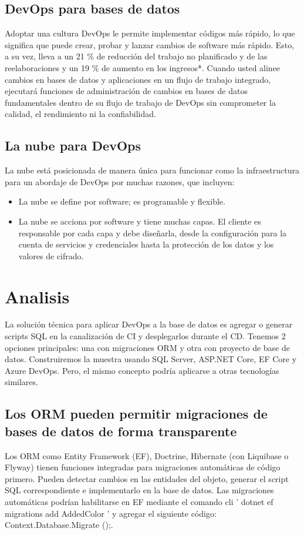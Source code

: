 \documentclass[preprint,12pt]{elsarticle}
\begin{document}
\subsection{DevOps para bases de datos}	


Adoptar una cultura DevOps le permite implementar códigos más rápido, lo que significa que puede crear, probar y lanzar cambios de software más rápido. Esto, a su vez, lleva a un 21 \% de reducción del trabajo no planificado y de las reelaboraciones y un 19 \% de aumento en los ingresos*. Cuando usted alinee cambios en bases de datos y aplicaciones en un flujo de trabajo integrado, ejecutará funciones de administración de cambios en bases de datos fundamentales dentro de su flujo de trabajo de DevOps sin comprometer la calidad, el rendimiento ni la confiabilidad.\citep{referencia10}


\subsection{La nube para DevOps}

La nube está posicionada de manera única para funcionar como la infraestructura para un abordaje de DevOps por muchas razones, que incluyen:
\begin{itemize}

\item La nube se define por software; es programable y flexible.
\item La nube se acciona por software y tiene muchas capas. El cliente es responsable por cada capa y debe diseñarla, desde la configuración para la cuenta de servicios y credenciales hasta la protección de los datos y los valores de cifrado.\citep{referencia09}
\end{itemize} 


\section{Analisis}

La solución técnica para aplicar DevOps a la base de datos es agregar o generar scripts SQL en la canalización de CI y desplegarlos durante el CD.
Tenemos 2 opciones principales: una con migraciones ORM y otra con proyecto de base de datos. Construiremos la muestra usando SQL Server, ASP.NET Core, EF Core y Azure DevOps. Pero, el mismo concepto podría aplicarse a otras tecnologías similares.

\subsection{Los ORM pueden permitir migraciones de bases de datos de forma transparente}
Los ORM como Entity Framework (EF), Doctrine, Hibernate (con Liquibase o Flyway) tienen funciones integradas para migraciones automáticas de código primero. Pueden detectar cambios en las entidades del objeto, generar el script SQL correspondiente e implementarlo en la base de datos.
Las migraciones automáticas podrían habilitarse en EF mediante el comando cli ' dotnet ef migrations add AddedColor ' y agregar el siguiente código: Context.Database.Migrate ();.
\end{document}
